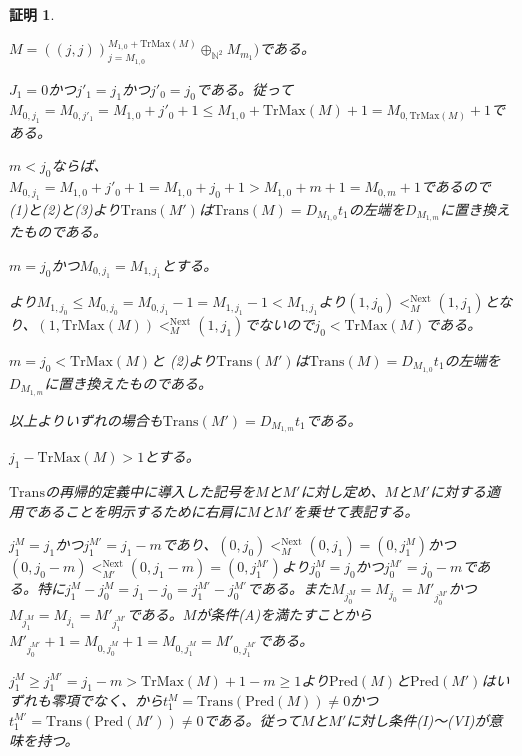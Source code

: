 \documentclass[dvipdfmx,uplatex]{jsarticle}
\theoremstyle{customnonumberbreakfortheorem}
\theoremstyle{customnonumberbreakforproof}
\newtheorem{hideableproof}{証明}
\begin{document}
\begin{hideableproof}
\begin{indented}
\begin{indented}
			\item \(M = ((j,j))_{j=M_{1,0}}^{M_{1,0} + \textrm{TrMax}(M)} \oplus_{\mathbb{N}^2} M_{m_1})\)である。
			\item \(J_1 = 0\)かつ\(j'_1 = j_1\)かつ\(j'_0 = j_0\)である。従って\(M_{0,j_1} = M_{0,j'_1} = M_{1,0} + j'_0 + 1 \leq M_{1,0} + \textrm{TrMax}(M) + 1 = M_{0,\textrm{TrMax}(M)}+1\)である。
			\item \(m < j_0\)ならば、\(M_{0,j_1} = M_{1,0} + j'_0 + 1 = M_{1,0} + j_0 + 1 > M_{1,0} + m + 1= M_{0,m} + 1\)であるので (1)と(2)と(3)より\(\textrm{Trans}(M')\)は\(\textrm{Trans}(M) = D_{M_{1,0}} t_1\)の左端を\(D_{M_{1,m}}\)に置き換えたものである。
			\item \(m = j_0\)かつ\(M_{0,j_1} = M_{1,j_1}\)とする。
			\begin{indented}
				\item {}より\(M_{1,j_0} \leq M_{0,j_0} = M_{0,j_1}-1 = M_{1,j_1}-1 < M_{1,j_1}\)より\((1,j_0) <_M^{\textrm{Next}} (1,j_1)\)となり、\((1,\textrm{TrMax}(M)) <_M^{\textrm{Next}} (1,j_1)\)でないので\(j_0 < \textrm{TrMax}(M)\)である。
				\item \(m = j_0 < \textrm{TrMax}(M)\)と (2)より\(\textrm{Trans}(M')\)は\(\textrm{Trans}(M) = D_{M_{1,0}} t_1\)の左端を\(D_{M_{1,m}}\)に置き換えたものである。
			\end{indented}
			\item 以上よりいずれの場合も\(\textrm{Trans}(M') = D_{M_{1,m}} t_1\)である。
		\end{indented}
		\item
		\item \(j_1 - \textrm{TrMax}(M) > 1\)とする。
		\begin{indented}
			\item \(\textrm{Trans}\)の再帰的定義中に導入した記号を\(M\)と\(M'\)に対し定め、\(M\)と\(M'\)に対する適用であることを明示するために右肩に\(M\)と\(M'\)を乗せて表記する。
			\item \(j_1^M = j_1\)かつ\(j_1^{M'} = j_1-m\)であり、\((0,j_0) <_M^{\textrm{Next}} (0,j_1) = (0,j_1^M)\)かつ\((0,j_0-m) <_{M'}^{\textrm{Next}} (0,j_1-m) = (0,j_1^{M'})\)より\(j_0^M = j_0\)かつ\(j_0^{M'} = j_0-m\)である。特に\(j_1^M-j_0^M = j_1-j_0 = j_1^{M'}-j_0^{M'}\)である。また\(M_{j_0^M} = M_{j_0} = M'_{j_0^{M'}}\)かつ\(M_{j_1^M} = M_{j_1} = M'_{j_1^{M'}}\)である。\(M\)が条件(A)を満たすことから\(M'_{j_0^{M'}}+1 = M_{0,j_0^M}+1 = M_{0,j_1^M} = M'_{0,j_1^{M'}}\)である。
			\item \(j_1^M \geq j_1^{M'} = j_1-m > \textrm{TrMax}(M)+1-m \geq 1\)より\(\textrm{Pred}(M)\)と\(\textrm{Pred}(M')\)はいずれも零項でなく、から\(t_1^M = \textrm{Trans}(\textrm{Pred}(M)) \neq 0\)かつ\(t_1^{M'} = \textrm{Trans}(\textrm{Pred}(M')) \neq 0\)である。従って\(M\)と\(M'\)に対し条件(I)～(VI)が意味を持つ。

\end{indented}
\end{indented}
\end{hideableproof}
\end{document}
